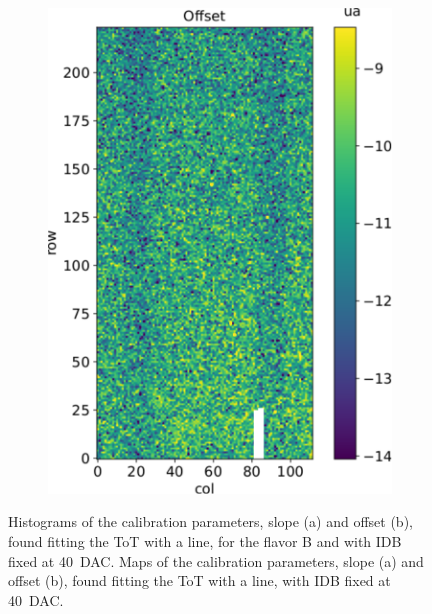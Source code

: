 \begin{figure}
\begin{subfigure}[b]{0.49\textwidth}
            \includegraphics[width=\linewidth]{figures/charaterization/offset_map.pdf}          
            \caption{}
            \label{fig:offset_map}
        \end{subfigure}
        \caption{Histograms of the calibration parameters, slope (a) and offset (b), found fitting the ToT with a line, for the flavor B and with IDB fixed at \SI{40}{DAC}. Maps of the calibration parameters, slope (a) and offset (b), found fitting the ToT with a line, with IDB fixed at \SI{40}{DAC}.}
           \label{fig:ToT_histograms}
   \end{figure}
        
